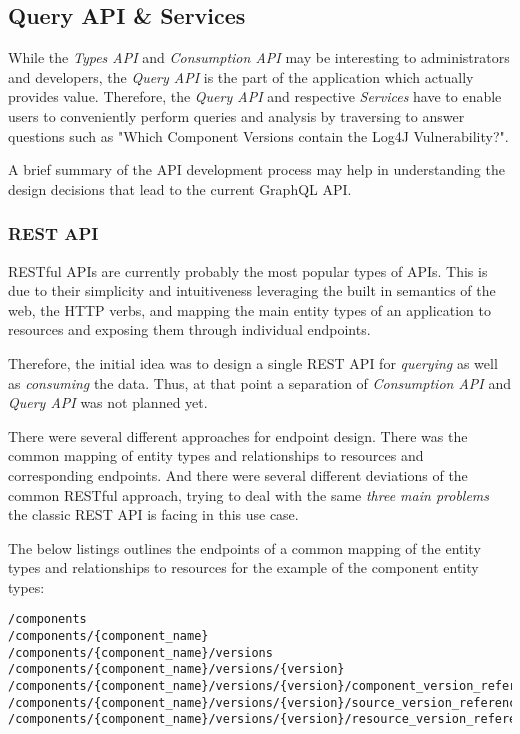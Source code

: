 \subsection{Query API \& Services}
While the \emph{Types API} and \emph{Consumption API} may be interesting to administrators and developers, the \emph{Query API} is the part of the application which actually provides value. Therefore, the \emph{Query API} and respective \emph{Services} have to enable users to conveniently perform queries and analysis by traversing to answer questions such as "Which Component Versions contain the Log4J Vulnerability?".\par
A brief summary of the API development process may help in understanding the design decisions that lead to the current GraphQL API. 

\subsubsection{REST API}
RESTful APIs are currently probably the most popular types of APIs. This is due to their simplicity and intuitiveness leveraging the built in semantics of the web, the HTTP verbs, and mapping the main entity types of an application to resources and exposing them through individual endpoints.\par
Therefore, the initial idea was to design a single REST API for \emph{querying} as well as \emph{consuming} the data. Thus, at that point a separation of \emph{Consumption API} and \emph{Query API} was not planned yet.\par 
There were several different approaches for endpoint design. There was the common mapping of entity types and relationships to resources and corresponding endpoints. And there were several different deviations of the common RESTful approach, trying to deal with the same \emph{three main problems} the classic REST API is facing in this use case.\par 
The below listings outlines the endpoints of a common mapping of the entity types and relationships to resources for the example of the component entity types:

\begin{lstlisting}[basicstyle=\tiny, caption=REST API Endpoints, captionpos=b, label=lst:RESTAPIEndpoints]
/components
/components/{component_name}
/components/{component_name}/versions
/components/{component_name}/versions/{version}
/components/{component_name}/versions/{version}/component_version_references
/components/{component_name}/versions/{version}/source_version_references
/components/{component_name}/versions/{version}/resource_version_references
\end{lstlisting}

